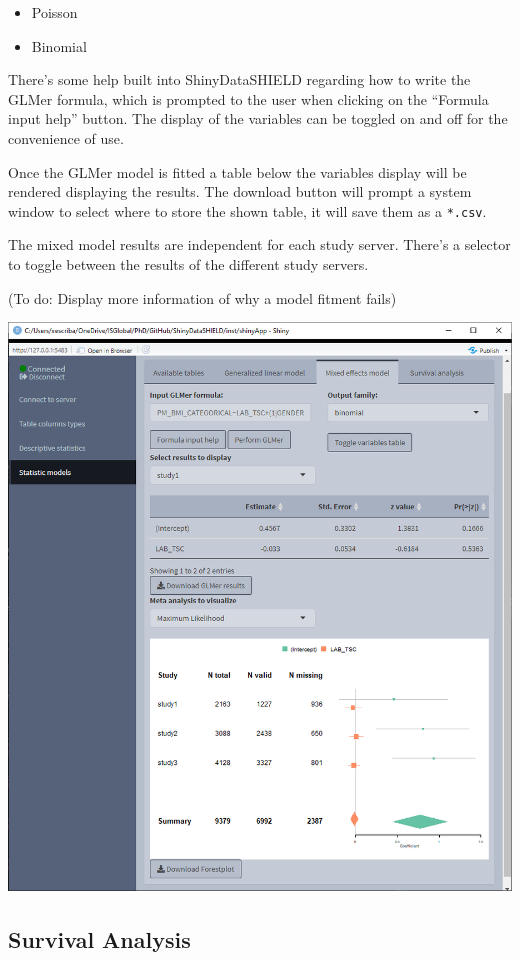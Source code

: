 \documentclass[
]{book}
\providecommand{\tightlist}{%
  \setlength{\itemsep}{0pt}\setlength{\parskip}{0pt}}
\begin{document}
\begin{itemize}
\tightlist
\item
  Poisson
\item
  Binomial
\end{itemize}

There's some help built into ShinyDataSHIELD regarding how to write the GLMer formula, which is prompted to the user when clicking on the ``Formula input help'' button. The display of the variables can be toggled on and off for the convenience of use.

Once the GLMer model is fitted a table below the variables display will be rendered displaying the results. The download button will prompt a system window to select where to store the shown table, it will save them as a \texttt{*.csv}.

The mixed model results are independent for each study server. There's a selector to toggle between the results of the different study servers.

(To do: Display more information of why a model fitment fails)

\includegraphics{images/stat_models2.png}

\hypertarget{survival-analysis}{%
\subsection{Survival Analysis}\label{survival-analysis}}
\end{document}

